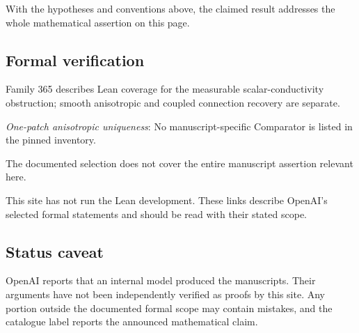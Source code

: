 \documentclass[11pt]{article}
\begin{document}
With the hypotheses and conventions above, the claimed result addresses the whole mathematical assertion on this page.

\subsection{Formal verification}
Family 365 describes Lean coverage for the measurable scalar-conductivity obstruction; smooth anisotropic and coupled connection recovery are separate.

\textit{One-patch anisotropic uniqueness}: No manuscript-specific Comparator is listed in the pinned inventory.

The documented selection does not cover the entire manuscript assertion relevant here.

This site has not run the Lean development. These links describe OpenAI’s selected formal statements and should be read with their stated scope.

\subsection{Status caveat}
OpenAI reports that an internal model produced the manuscripts. Their arguments have not been independently verified as proofs by this site. Any portion outside the documented formal scope may contain mistakes, and the catalogue label reports the announced mathematical claim.
\end{document}
